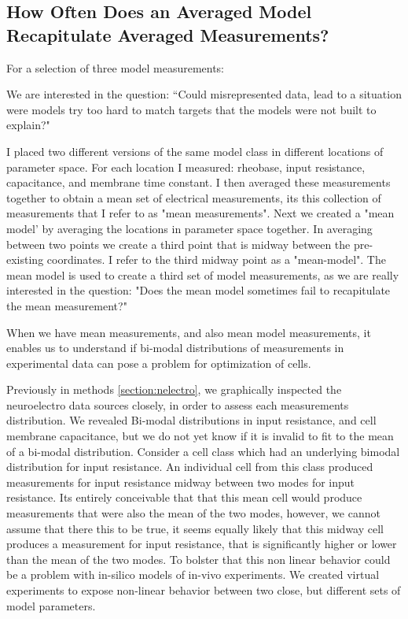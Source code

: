 \subsection{How Often Does an Averaged Model Recapitulate Averaged Measurements?}
For a selection of three model measurements:

We are interested in the question: ``Could misrepresented data, lead to a situation were models try too hard to match targets that the models were not built to explain?" %

I placed two different versions of the same  model class in different locations of parameter space. For each location I measured: rheobase, input resistance, capacitance, and membrane time constant.
I then averaged these measurements together to obtain a mean set of electrical measurements, its this collection of measurements that I refer to as "mean measurements". Next we created a "mean model' by averaging the locations in parameter space together.
In averaging between two points we create a third point that is midway between the pre-existing coordinates. I refer to the third midway point as a "mean-model".
The mean model is used to create a third set of model measurements, as we are really interested in the question: "Does the mean model sometimes fail to recapitulate the mean measurement?"


When we have mean measurements, and also mean model measurements, it enables us to understand if bi-modal distributions of measurements in experimental data can pose a problem for optimization of cells.

Previously in methods \ref{section:nelectro}, we graphically inspected the neuroelectro data sources closely, in order to assess each measurements distribution.
We revealed Bi-modal distributions in input resistance, and cell membrane capacitance, but we do not yet know if it is invalid to fit to the mean of a bi-modal distribution.
Consider a  cell class which had an underlying bimodal distribution for input resistance. An individual cell from this class produced measurements for input resistance midway between two modes for input resistance.
Its entirely conceivable that that this mean cell would produce measurements that were also the mean of the two modes, however, we cannot assume that there this to be true, it seems equally likely that this midway cell produces a measurement for input resistance, that is significantly higher or lower than the mean of the two modes. To bolster that this non linear behavior could be a problem with in-silico models of in-vivo experiments.
We created virtual experiments to expose non-linear behavior between two  close, but different sets of model parameters.

